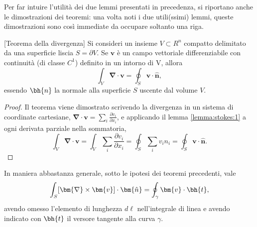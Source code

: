 Per far intuire l'utilità dei due lemmi presentati in precedenza, si riportano anche le dimostrazioni dei teoremi: una volta noti i due utili(ssimi) lemmi, queste dimostrazioni sono così immediate da occupare soltanto una riga.

\begin{theorem}\label{thm:grad}[Teorema della divergenza] Si consideri un insieme $V \subset R^n$ compatto delimitato da una superficie liscia $S = \partial V$. Se $\mathbf{v}$ è un campo vettoriale differenziabile con continuità (di classe $C^1$) definito in un intorno di V, allora
\begin{equation}
  \int_V \bm{\nabla} \cdot \bm{v} = \oint_S \bm{v} \cdot \hat{\bm{n}} ,
\end{equation}
 essendo $\bh{n}$ la normale alla superficie $S$ uscente dal volume $V$.
\end{theorem}

\begin{proof}
Il teorema viene dimostrato scrivendo la divergenza in un sistema di coordinate cartesiane, $\bm{\nabla} \cdot \bm{v} = \sum_i \frac{\partial v_i}{\partial x_i}$, e applicando il lemma \ref{lemma:stokes:1} a ogni derivata parziale nella sommatoria,
\begin{equation}
\int_V \bm{\nabla} \cdot \bm{v} = 
  \int_V \sum_i \frac{\partial v_i}{\partial x_i} = \oint_S \sum_i v_i n_i = \oint_S \bm{v} \cdot \bm{\hat{n}} .
\end{equation}
\end{proof}

\begin{theorem} In maniera abbastanza generale, sotto le ipotesi dei teoremi precedenti, vale
\begin{equation}
  \int_S [\bm{\nabla} \times \bm{v}] \cdot \bm{\hat{n}} = \oint_{\gamma} \bm{v} \cdot \bh{t} ,
\end{equation}
  avendo omesso l'elemento di lunghezza $d\ell$ nell'integrale di linea e avendo indicato con $\bh{t}$ il versore tangente alla curva $\gamma$.
\end{theorem}

